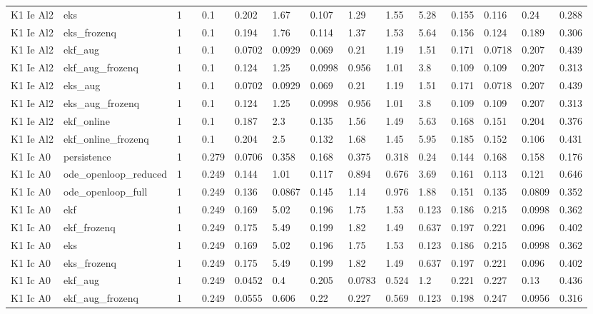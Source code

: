 \begin{table}[t]
\begin{tabular}{lllllllllllllll}
K1 Ie Al2 & eks & 1 &  & 0.1 & 0.202 & 1.67 & 0.107 & 1.29 & 1.55 & 5.28 & 0.155 & 0.116 & 0.24 & 0.288 \\
K1 Ie Al2 & eks\_frozenq & 1 &  & 0.1 & 0.194 & 1.76 & 0.114 & 1.37 & 1.53 & 5.64 & 0.156 & 0.124 & 0.189 & 0.306 \\
K1 Ie Al2 & ekf\_aug & 1 &  & 0.1 & 0.0702 & 0.0929 & 0.069 & 0.21 & 1.19 & 1.51 & 0.171 & 0.0718 & 0.207 & 0.439 \\
K1 Ie Al2 & ekf\_aug\_frozenq & 1 &  & 0.1 & 0.124 & 1.25 & 0.0998 & 0.956 & 1.01 & 3.8 & 0.109 & 0.109 & 0.207 & 0.313 \\
K1 Ie Al2 & eks\_aug & 1 &  & 0.1 & 0.0702 & 0.0929 & 0.069 & 0.21 & 1.19 & 1.51 & 0.171 & 0.0718 & 0.207 & 0.439 \\
K1 Ie Al2 & eks\_aug\_frozenq & 1 &  & 0.1 & 0.124 & 1.25 & 0.0998 & 0.956 & 1.01 & 3.8 & 0.109 & 0.109 & 0.207 & 0.313 \\
K1 Ie Al2 & ekf\_online & 1 &  & 0.1 & 0.187 & 2.3 & 0.135 & 1.56 & 1.49 & 5.63 & 0.168 & 0.151 & 0.204 & 0.376 \\
K1 Ie Al2 & ekf\_online\_frozenq & 1 &  & 0.1 & 0.204 & 2.5 & 0.132 & 1.68 & 1.45 & 5.95 & 0.185 & 0.152 & 0.106 & 0.431 \\
K1 Ic A0 & persistence & 1 &  & 0.279 & 0.0706 & 0.358 & 0.168 & 0.375 & 0.318 & 0.24 & 0.144 & 0.168 & 0.158 & 0.176 \\
K1 Ic A0 & ode\_openloop\_reduced & 1 &  & 0.249 & 0.144 & 1.01 & 0.117 & 0.894 & 0.676 & 3.69 & 0.161 & 0.113 & 0.121 & 0.646 \\
K1 Ic A0 & ode\_openloop\_full & 1 &  & 0.249 & 0.136 & 0.0867 & 0.145 & 1.14 & 0.976 & 1.88 & 0.151 & 0.135 & 0.0809 & 0.352 \\
K1 Ic A0 & ekf & 1 &  & 0.249 & 0.169 & 5.02 & 0.196 & 1.75 & 1.53 & 0.123 & 0.186 & 0.215 & 0.0998 & 0.362 \\
K1 Ic A0 & ekf\_frozenq & 1 &  & 0.249 & 0.175 & 5.49 & 0.199 & 1.82 & 1.49 & 0.637 & 0.197 & 0.221 & 0.096 & 0.402 \\
K1 Ic A0 & eks & 1 &  & 0.249 & 0.169 & 5.02 & 0.196 & 1.75 & 1.53 & 0.123 & 0.186 & 0.215 & 0.0998 & 0.362 \\
K1 Ic A0 & eks\_frozenq & 1 &  & 0.249 & 0.175 & 5.49 & 0.199 & 1.82 & 1.49 & 0.637 & 0.197 & 0.221 & 0.096 & 0.402 \\
K1 Ic A0 & ekf\_aug & 1 &  & 0.249 & 0.0452 & 0.4 & 0.205 & 0.0783 & 0.524 & 1.2 & 0.221 & 0.227 & 0.13 & 0.436 \\
K1 Ic A0 & ekf\_aug\_frozenq & 1 &  & 0.249 & 0.0555 & 0.606 & 0.22 & 0.227 & 0.569 & 0.123 & 0.198 & 0.247 & 0.0956 & 0.316 \\

\end{tabular}
\end{table}
